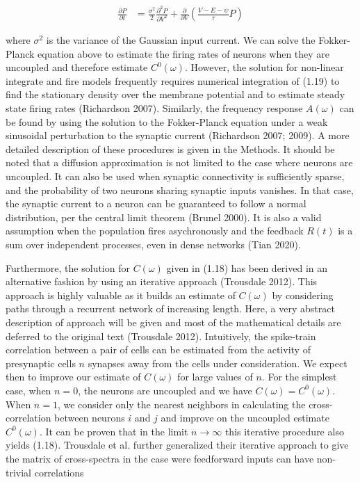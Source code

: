 \documentclass{ucetd}
\begin{document}
\begin{align}
\frac{\partial P}{\partial t} &= \frac{\sigma^{2}}{2}\frac{\partial^{2}P}{\partial V^{2}} + \frac{\partial}{\partial V}\left(\frac{V-E-\psi}{\tau}P\right)
\end{align}

where $\sigma^{2}$ is the variance of the Gaussian input current. We can solve the Fokker-Planck equation above to estimate the firing rates of neurons when they are uncoupled and therefore estimate $C^{0}(\omega)$. However, the solution for non-linear integrate and fire models frequently requires numerical integration of (1.19) to find the stationary density over the membrane potential and to estimate steady state firing rates (Richardson 2007). Similarly, the frequency response $A(\omega)$ can be found by using the solution to the Fokker-Planck equation under a weak sinusoidal perturbation to the synaptic current (Richardson 2007; 2009). A more detailed description of these procedures is given in the Methods. It should be noted that a diffusion approximation is not limited to the case where neurons are uncoupled. It can also be used when synaptic connectivity is sufficiently sparse, and the probability of two neurons sharing synaptic inputs vanishes. In that case, the synaptic current to a neuron can be guaranteed to follow a normal distribution, per the central limit theorem (Brunel 2000).  It is also a valid assumption when the population fires asychronously and the feedback $R(t)$ is a sum over independent processes, even in dense networks (Tian 2020).

Furthermore, the solution for $C(\omega)$ given in (1.18) has been derived in an alternative fashion by using an iterative approach (Trousdale 2012). This approach is highly valuable as it builds an estimate of $C(\omega)$ by considering paths through a recurrent network of increasing length. Here, a very abstract description of approach will be given and most of the mathematical details are deferred to the original text (Trousdale 2012). Intuitively, the spike-train correlation between a pair of cells can be estimated from the activity of presynaptic cells $n$ synapses away from the cells under consideration. We expect then to improve our estimate of $C(\omega)$ for large values of $n$. For the simplest case, when $n=0$, the neurons are uncoupled and we have $C(\omega) = C^{0}(\omega)$. When $n=1$, we consider only the nearest neighbors in calculating the cross-correlation between neurons $i$ and $j$ and improve on the uncoupled estimate $C^{0}(\omega)$. It can be proven that in the limit $n\rightarrow\infty$ this iterative procedure also yields (1.18). Trousdale et al. further generalized their iterative approach to give the matrix of cross-spectra in the case were feedforward inputs can have non-trivial correlations
\end{document}
